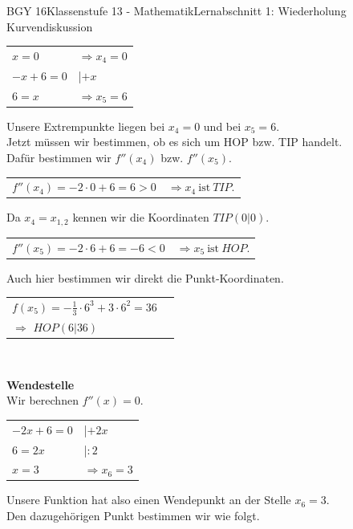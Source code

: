 \documentclass[oneside,openany,headings=optiontotoc,11pt,numbers=noenddot]{scrreprt}
\begin{document}
\begin{worksheet}{BGY 16}{Klassenstufe 13 - Mathematik}{Lernabschnitt 1: Wiederholung Kurvendiskussion}
\begin{framed}
\begin{tabularx}{\textwidth}{ll}
				\\
				\(x = 0\) & \(\Rightarrow x_4=0\)\\
				\(-x+6 = 0\) & |\(+x\)\\
				\(6 = x\) & \(\Rightarrow x_5=6\)\\
			\end{tabularx}
			Unsere Extrempunkte liegen bei \colorbox{green!5}{\(x_4=0\)} und bei \colorbox{green!5}{\(x_5=6\)}.\\
			Jetzt müssen wir bestimmen, ob es sich um HOP bzw. TIP handelt.\\
			Dafür bestimmen wir \(f''(x_4)\) bzw. \(f''(x_5)\).\\
			\begin{tabularx}{\textwidth}{ll}
				\\
				\(f''(x_4) = -2\cdot{}0 +6 = 6 > 0\) & \(\Rightarrow x_4\ \text{ist}\ TIP\).
			\end{tabularx}
			Da \(x_4 = x_{1,2}\) kennen wir die Koordinaten \colorbox{green!10}{\(TIP(0|0)\)}.\\
			\begin{tabularx}{\textwidth}{ll}
				\\
				\(f''(x_5) = -2\cdot{}6 +6 = -6 < 0\) & \(\Rightarrow x_5\ \text{ist}\ HOP\).\\
			\end{tabularx}
			Auch hier bestimmen wir direkt die Punkt-Koordinaten.\\
			\begin{tabularx}{\textwidth}{ll}
				\\
				\(f(x_5) = -\frac{1}{3}\cdot{}6^3 +3\cdot{}6^2 = 36\)\\
				\(\Rightarrow\) \colorbox{green!10}{\(HOP(6|36)\)}
			\end{tabularx}\\
			\par\noindent
			\textbf{Wendestelle}\\
			Wir berechnen \(f''(x) = 0\).\\
			\begin{tabularx}{\textwidth}{ll}
				\(-2x+6 = 0\) & |\(+2x\)\\
				\(6 = 2x\) & |\(:2\)\\
				\(x = 3\) & \(\Rightarrow x_6=3\)\\
			\end{tabularx}
			Unsere Funktion hat also einen Wendepunkt an der Stelle \colorbox{green!10}{\(x_6=3\)}.\\
			Den dazugehörigen Punkt bestimmen wir wie folgt.\\

\end{framed}
\end{worksheet}
\end{document}
